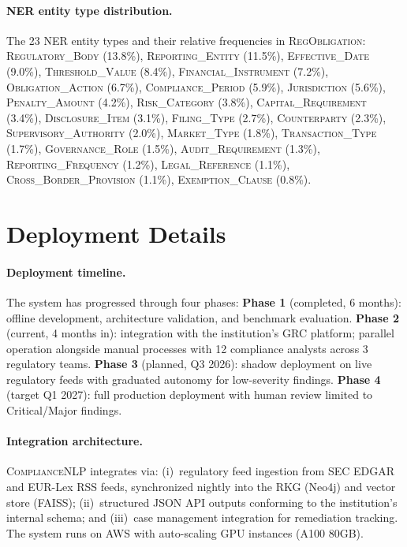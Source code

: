 \documentclass[11pt]{article}
\begin{document}
\paragraph{NER entity type distribution.} The 23 NER entity types and their relative frequencies in \textsc{RegObligation}:
\textsc{Regulatory\_Body} (13.8\%), \textsc{Reporting\_Entity} (11.5\%), \textsc{Effective\_Date} (9.0\%), \textsc{Threshold\_Value} (8.4\%), \textsc{Financial\_Instrument} (7.2\%), \textsc{Obligation\_Action} (6.7\%), \textsc{Compliance\_Period} (5.9\%), \textsc{Jurisdiction} (5.6\%), \textsc{Penalty\_Amount} (4.2\%), \textsc{Risk\_Category} (3.8\%), \textsc{Capital\_Requirement} (3.4\%), \textsc{Disclosure\_Item} (3.1\%), \textsc{Filing\_Type} (2.7\%), \textsc{Counterparty} (2.3\%), \textsc{Supervisory\_Authority} (2.0\%), \textsc{Market\_Type} (1.8\%), \textsc{Transaction\_Type} (1.7\%), \textsc{Governance\_Role} (1.5\%), \textsc{Audit\_Requirement} (1.3\%), \textsc{Reporting\_Frequency} (1.2\%), \textsc{Legal\_Reference} (1.1\%), \textsc{Cross\_Border\_Provision} (1.1\%), \textsc{Exemption\_Clause} (0.8\%).


\section{Deployment Details}
\label{app:deploy_details}

\paragraph{Deployment timeline.} The system has progressed through four phases: \textbf{Phase 1} (completed, 6 months): offline development, architecture validation, and benchmark evaluation. \textbf{Phase 2} (current, 4 months in): integration with the institution's GRC platform; parallel operation alongside manual processes with 12 compliance analysts across 3 regulatory teams. \textbf{Phase 3} (planned, Q3 2026): shadow deployment on live regulatory feeds with graduated autonomy for low-severity findings. \textbf{Phase 4} (target Q1 2027): full production deployment with human review limited to Critical/Major findings.

\paragraph{Integration architecture.} \textsc{ComplianceNLP} integrates via: (i)~regulatory feed ingestion from SEC EDGAR and EUR-Lex RSS feeds, synchronized nightly into the RKG (Neo4j) and vector store (FAISS); (ii)~structured JSON API outputs conforming to the institution's internal schema; and (iii)~case management integration for remediation tracking. The system runs on AWS with auto-scaling GPU instances (A100 80GB).
\end{document}

